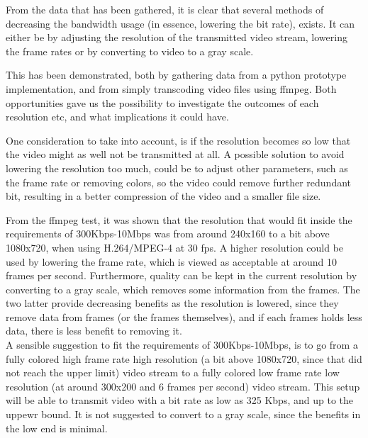 From the data that has been gathered, it is clear that several methods of decreasing the bandwidth usage (in essence, lowering the bit rate), exists. It can either be by adjusting the resolution of the transmitted video stream, lowering the frame rates or by converting to video to a gray scale.

This has been demonstrated, both by gathering data from a python prototype implementation, and from simply transcoding video files using ffmpeg. Both opportunities gave us the possibility to investigate the outcomes of each resolution etc, and what implications it could have. 

One consideration to take into account, is if the resolution becomes so low that the video might as well not be transmitted at all. A possible solution to avoid lowering the resolution too much, could be to adjust other parameters, such as the frame rate or removing colors, so the video could remove further redundant bit, resulting in a better compression of the video and a smaller file size.

From the ffmpeg test, it was shown that the resolution that would fit inside the requirements of 300Kbps-10Mbps was from around 240x160 to a bit above 1080x720, when using H.264/MPEG-4 at 30 fps. A higher resolution could be used by lowering the frame rate, which is viewed as acceptable at around 10 frames per second. Furthermore, quality can be kept in the current resolution by converting to a gray scale, which removes some information from the frames. The two latter provide decreasing benefits as the resolution is lowered, since they remove data from frames (or the frames themselves), and if each frames holds less data, there is less benefit to removing it.\\

A sensible suggestion to fit the requirements of 300Kbps-10Mbps, is to go from a fully colored high frame rate high resolution (a bit above 1080x720, since that did not reach the upper limit) video stream to a fully colored low frame rate low resolution (at around 300x200 and 6 frames per second) video stream. This setup will be able to transmit video with a bit rate as low as 325 Kbps, and up to the uppewr bound. It is not suggested to convert to a gray scale, since the benefits in the low end is minimal.
